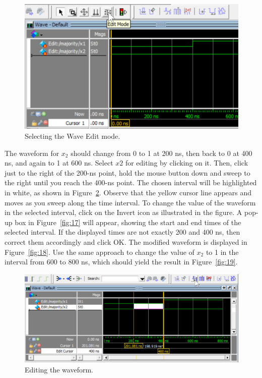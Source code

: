 \documentclass[11pt, twoside, pdftex]{article}
\begin{document}
\begin{figure}[H]
   \begin{center}
      \includegraphics[scale=0.75]{figures/edit_mode.png}
   \caption{Selecting the Wave Edit mode.} 
	 \label{fig:15}
	 \end{center}
\end{figure}

The waveform for $x_2$ should change from 0 to 1 at 200 ns, then back to 0 at 400 ns, 
and again to 1 at 600 ns. Select $x2$ for editing by clicking on it. Then, click just to the 
right of the 200-ns point, hold the mouse button down and sweep to the right until 
you reach the 400-ns point. The chosen interval will be highlighted in white, as shown in 
Figure~\ref{fig:16}.  Observe that the yellow cursor line appears and moves as you sweep
along the time interval.  To change the value of the waveform in the selected interval, click on the 
{\sf Invert} icon as illustrated in the figure. A pop-up box in Figure~\ref{fig:17} will 
appear, showing the start and end times of the selected interval. If the displayed times are 
not exactly 200 and 400 ns, then correct them accordingly and click {\sf OK}. The modified 
waveform is displayed in Figure~\ref{fig:18}.  Use the same approach to change the value 
of $x_2$ to 1 in the interval from 600 to 800 ns, which should yield the result in 
Figure~\ref{fig:19}.

\begin{figure}[H]
   \begin{center}
      \includegraphics[scale=1.0]{figures/figure16.png}
   \caption{Editing the waveform.} 
	 \label{fig:16}
	 \end{center}
\end{figure}
\end{document}
